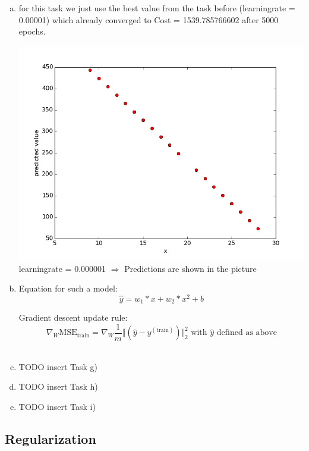 \documentclass[12pt]{article}
\begin{document}
\begin{enumerate}[a)]
    \item 
        for this task we just use the best value from the task before (learningrate = 0.00001) which already converged to Cost = 1539.785766602 after 5000 epochs. 
		\begin{center}
                    \includegraphics[scale = 0.52]{pictures/onedimprediction.png}\\
                    learningrate = 0.000001 $\Rightarrow$ Predictions are shown in the picture\\
         \end{center}
    \item 
         Equation for such a model:
        $$ \hat{y} = w_1*x + w_2*x^2 + b $$

        Gradient descent update rule:
        $$ \nabla_W \text{MSE}_\text{train} = \nabla_W \frac{1}{m} \Vert (\hat{y} - y^{(\text{train})}) \Vert^2_2 \text{ with } \hat{y} \text{ defined as above}$$\\

    \item 
        TODO insert Task g)

    \item 
        TODO insert Task h)

    \item 
        TODO insert Task i)

\end{enumerate}

\subsection{Regularization}
\end{document}
